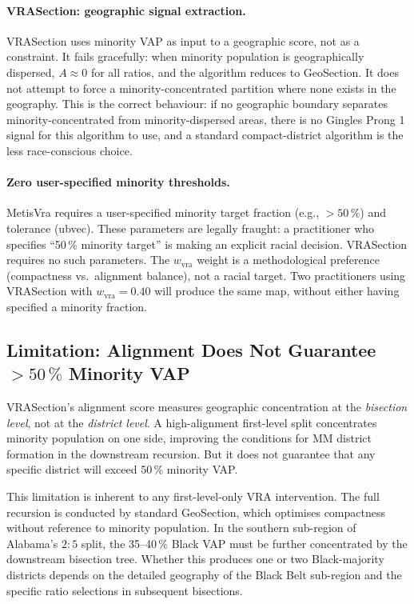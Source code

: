 \paragraph{VRASection: geographic signal extraction.}
VRASection uses minority VAP as input to a geographic score, not as a
constraint.
It fails gracefully: when minority population is geographically dispersed,
$A \approx 0$ for all ratios, and the algorithm reduces to GeoSection.
It does not attempt to force a minority-concentrated partition where none
exists in the geography.
This is the correct behaviour: if no geographic boundary separates
minority-concentrated from minority-dispersed areas, there is no
Gingles Prong 1 signal for this algorithm to use, and a standard
compact-district algorithm is the less race-conscious choice.

\paragraph{Zero user-specified minority thresholds.}
MetisVra requires a user-specified minority target fraction (e.g., $>50\,\%$)
and tolerance (ubvec).
These parameters are legally fraught: a practitioner who specifies
``50\,\% minority target'' is making an explicit racial decision.
VRASection requires no such parameters.
The $w_\text{vra}$ weight is a methodological preference
(compactness vs.\ alignment balance), not a racial target.
Two practitioners using VRASection with $w_\text{vra} = 0.40$ will
produce the same map, without either having specified a minority fraction.

\subsection{\texorpdfstring{Limitation: Alignment Does Not Guarantee $> 50\,\%$ Minority VAP}{Limitation: alignment does not guarantee majority-minority districts}}

VRASection's alignment score measures geographic concentration at the
\emph{bisection level}, not at the \emph{district level}.
A high-alignment first-level split concentrates minority population on
one side, improving the conditions for MM district formation in the
downstream recursion.
But it does not guarantee that any specific district will exceed 50\,\%
minority VAP.

This limitation is inherent to any first-level-only VRA intervention.
The full recursion is conducted by standard GeoSection, which optimises
compactness without reference to minority population.
In the southern sub-region of Alabama's $2:5$ split, the 35--40\,\%
Black VAP must be further concentrated by the downstream bisection tree.
Whether this produces one or two Black-majority districts depends on the
detailed geography of the Black Belt sub-region and the specific ratio
selections in subsequent bisections.

